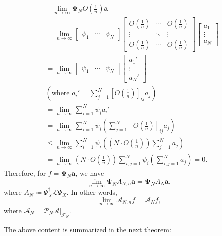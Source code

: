 \documentclass{article}[11]
\begin{document}
\begin{align*}
	&\quad \lim_{n\to\infty} \mathbf{\Psi}_N O(\tfrac{1}{n})\mathbf{a} \\
	&= \lim_{n\to\infty} 
	\begin{bmatrix}
		\psi_1 & \cdots & \psi_N
	\end{bmatrix}
	\begin{bmatrix}
		O(\tfrac{1}{n}) & \cdots & O(\tfrac{1}{n}) \\
		\vdots & \ddots & \vdots \\
		O(\tfrac{1}{n}) & \cdots & O(\tfrac{1}{n})
	\end{bmatrix}
	\begin{bmatrix}
		a_1 \\
		\vdots \\
		a_N
	\end{bmatrix} \\
	&= \lim_{n\to\infty} 
	\begin{bmatrix}
		\psi_1 & \cdots & \psi_N
	\end{bmatrix}
	\begin{bmatrix}
		a_1' \\
		\vdots \\
		a_N'
	\end{bmatrix} \\
	&(\text{where $a_i'=\sum_{j=1}^N [O(\tfrac{1}{n})]_{ij}a_j$}) \\
	&= \lim_{n\to\infty} \sum_{i=1}^N \psi_i a_i' \\
	&= \lim_{n\to\infty} \sum_{i=1}^N \psi_i \left( \sum_{j=1}^N [O(\tfrac{1}{n})]_{ij}a_j \right) \\
	&\leq \lim_{n\to\infty} \sum_{i=1}^N \psi_i \left( \left(N \cdot O(\tfrac{1}{n})\right) \sum_{j=1}^N a_j \right) \\
	&= \lim_{n\to\infty} \left(N \cdot O(\tfrac{1}{n})\right) \sum_{i,j=1}^N \psi_i \left( \sum_{i,j=1}^N a_j \right) = 0.
\end{align*}
Therefore, for $f=\mathbf{\Psi}_N\mathbf{a}$, we have
$$
\lim_{n\to\infty} \mathbf{\Psi}_N A_{N,n} \mathbf{a} = \mathbf{\Psi}_N A_N \mathbf{a},
$$ 
where $A_N \coloneqq \Psi_X^{\dagger}\mathcal{L}\Psi_X$. In other words,
$$
\lim_{n\to\infty} \mathcal{A}_{N,n} f = \mathcal{A}_N f,
$$
where $\mathcal{A}_N = \mathcal{P}_N \mathcal{A}|_{\mathcal{F}_N}$.

The above content is summarized in the next theorem:
\end{document}
